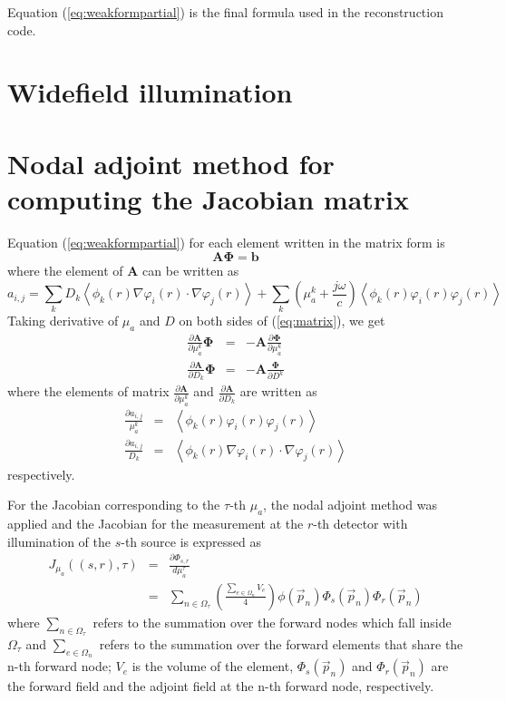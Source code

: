 \documentclass{article}
\begin{document}
Equation (\ref{eq:weakformpartial}) is the final formula used in
the reconstruction code.

\section{Widefield illumination}



\section{Nodal adjoint method for computing the Jacobian matrix}
Equation (\ref{eq:weakformpartial}) for each element written in the
matrix form is
\begin{equation}
\label{eq:matrix} \mathbf{A}{\boldsymbol\Phi}=\mathbf{b}
\end{equation}
where the element of $\mathbf{A}$ can be written as
\begin{equation}
a_{i,j}=\sum_{k}D_k\left\langle
\phi_k(r)\nabla\varphi_i(r)\cdot\nabla\varphi_j(r)\right\rangle+\sum_{k}\left(\mu_{a}^k+\frac{j\omega}{c}\right)\left\langle\phi_k(r)\varphi_i(r)\varphi_j(r)\right\rangle
\end{equation}
Taking derivative of $\mu_a$ and $D$ on both sides of
(\ref{eq:matrix}), we get
\begin{eqnarray}
\frac{\partial \mathbf{A}}{\partial
\mu_a^k}{\boldsymbol\Phi}&=&-\mathbf{A}\frac{\partial {\boldsymbol\Phi}}{\partial \mu_a^k}\\
\frac{\partial \mathbf{A}}{\partial
D_k}{\boldsymbol\Phi}&=&-\mathbf{A}\frac{\boldsymbol\Phi}{\partial
D^k}
\end{eqnarray}
where the elements of matrix $\frac{\partial \mathbf{A}}{\partial
\mu_a^k}$ and $\frac{\partial \mathbf{A}}{\partial D_k}$ are
written as
\begin{eqnarray}
\frac{\partial
a_{i,j}}{\mu_a^k}&=&\left\langle\phi_k(r)\varphi_i(r)\varphi_j(r)\right\rangle\\
\frac{\partial a_{i,j}}{D_k}&=&\left\langle
\phi_k(r)\nabla\varphi_i(r)\cdot\nabla\varphi_j(r)\right\rangle
\end{eqnarray}
respectively.

For the Jacobian corresponding to the $\tau$-th $\mu_a$, the nodal
adjoint method was applied and the Jacobian for the measurement at
the $r$-th detector with illumination of the $s$-th source is
expressed as
\begin{eqnarray}\nonumber
J_{\mu_a}((s,r),\tau)&=&\frac{\partial
\Phi_{s,r}}{d\mu_a^{\tau}}\\&=&\sum_{n\in\Omega_\tau}\left(\frac{\sum_{e\in\Omega_n}
V_e}{4}\right)\phi(\vec{p}_n)\Phi_s(\vec{p}_n)\Phi_r(\vec{p}_n)
\end{eqnarray}
where $\sum_{n\in\Omega_\tau}$ refers to the summation over the
forward nodes which fall inside $\Omega_\tau$ and
$\sum_{e\in\Omega_n}$ refers to the summation over the forward
elements that share the n-th forward node; $V_e$ is the volume of
the element, $\Phi_s(\vec{p}_n)$ and $\Phi_r(\vec{p}_n)$ are the
forward field and the adjoint field at the n-th forward node,
respectively.
\end{document}

